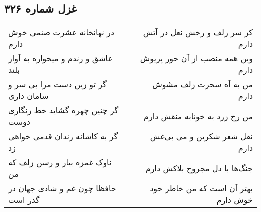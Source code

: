 \begin{center}
\section*{غزل شماره ۳۲۶}
\label{sec:sh326}
\begin{longtable}{l p{0.5cm} r}
در نهانخانه عشرت صنمی خوش دارم
&&
کز سر زلف و رخش نعل در آتش دارم
\\
عاشق و رندم و میخواره به آواز بلند
&&
وین همه منصب از آن حور پریوش دارم
\\
گر تو زین دست مرا بی سر و سامان داری
&&
من به آه سحرت زلف مشوش دارم
\\
گر چنین چهره گشاید خط زنگاری دوست
&&
من رخ زرد به خونابه منقش دارم
\\
گر به کاشانه رندان قدمی خواهی زد
&&
نقل شعر شکرین و می بی‌غش دارم
\\
ناوک غمزه بیار و رسن زلف که من
&&
جنگ‌ها با دل مجروح بلاکش دارم
\\
حافظا چون غم و شادی جهان در گذر است
&&
بهتر آن است که من خاطر خود خوش دارم
\\
\end{longtable}
\end{center}

